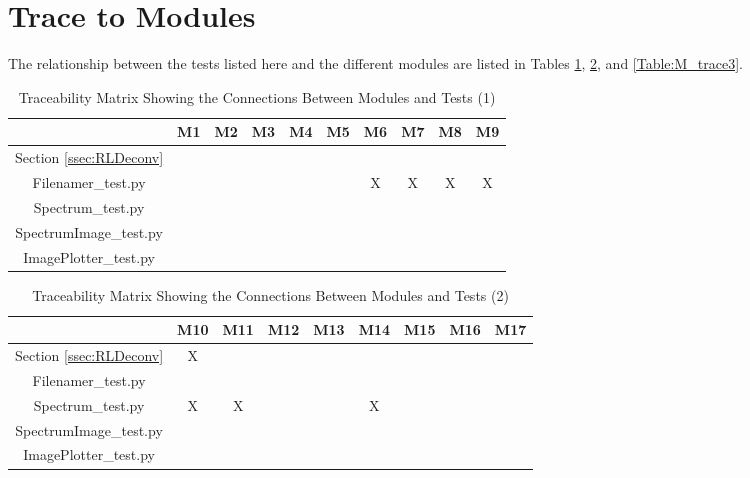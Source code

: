 \documentclass[12pt, titlepage]{article}
\begin{document}
\section{Trace to Modules}
The relationship between the tests listed here and the different modules are
listed in Tables \ref{Table:M_trace1}, \ref{Table:M_trace2}, and
\ref{Table:M_trace3}.
		
\begin{table}[h!]
    \centering
    \begin{tabular}{|c|c|c|c|c|c|c|c|c|c|}
        \hline
        & M1 & M2 & M3 & M4 & M5 & M6 & M7 & M8 & M9 \\
        \hline
        Section \ref{ssec:RLDeconv} & & & & & & & & & \\ \hline
        Filenamer\_test.py & & & & & & X & X & X & X \\ \hline
        Spectrum\_test.py & & & & & & & & & \\ \hline
        SpectrumImage\_test.py & & & & & & & & &  \\ \hline
        ImagePlotter\_test.py & & & & & & & & & \\ \hline
    \end{tabular}
    \caption{Traceability Matrix Showing the Connections Between Modules and Tests (1)}
    \label{Table:M_trace1}
\end{table}

\begin{table}[h!]
    \centering
    \begin{tabular}{|c|c|c|c|c|c|c|c|c|}
        \hline
        & M10 & M11 & M12 & M13 & M14 & M15 & M16 & M17 \\
        \hline
        Section \ref{ssec:RLDeconv} & X & & & & & & & \\ \hline
        Filenamer\_test.py & & & & & & & & \\ \hline
        Spectrum\_test.py & X & X & & & X & & & \\ \hline
        SpectrumImage\_test.py & & & & & &  & & \\ \hline
        ImagePlotter\_test.py & & & & & &  & & \\ \hline
    \end{tabular}
    \caption{Traceability Matrix Showing the Connections Between Modules and Tests (2)}
    \label{Table:M_trace2}
\end{table}
\end{document}
